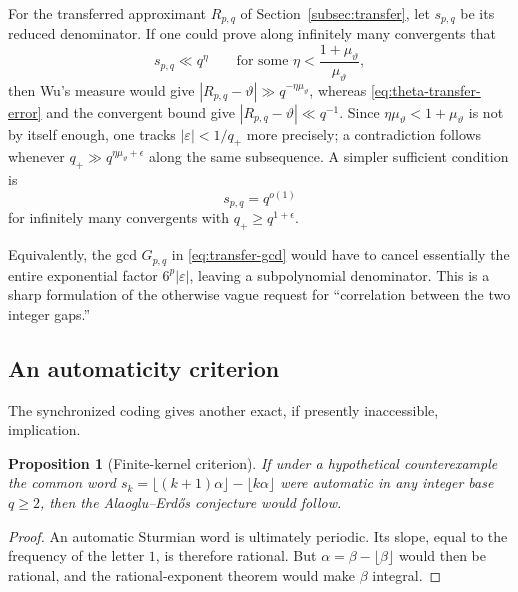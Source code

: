 \documentclass[11pt,oneside]{article}
\newtheorem{proposition}[theorem]{Proposition}
\theoremstyle{definition}
\theoremstyle{remark}
\begin{document}
For the transferred approximant $R_{p,q}$ of Section~\ref{subsec:transfer}, let $s_{p,q}$ be
its reduced denominator.  If one could prove along infinitely many convergents that
\begin{equation}\label{eq:poly-reduced-denominator}
 s_{p,q}\ll q^\eta
 \qquad\text{for some }\eta<\frac{1+\mu_\vartheta}{\mu_\vartheta},
\end{equation}
then Wu's measure would give
$|R_{p,q}-\vartheta|\gg q^{-\eta\mu_\vartheta}$, whereas
\eqref{eq:theta-transfer-error} and the convergent bound give
$|R_{p,q}-\vartheta|\ll q^{-1}$.  Since
$\eta\mu_\vartheta<1+\mu_\vartheta$ is not by itself enough, one tracks
$|\varepsilon|<1/q_{+}$ more precisely; a contradiction follows whenever
$q_{+}\gg q^{\eta\mu_\vartheta+\epsilon}$ along the same subsequence.  A simpler sufficient
condition is
\begin{equation}\label{eq:very-small-reduced-denominator}
 s_{p,q}=q^{o(1)}
\end{equation}
for infinitely many convergents with $q_{+}\ge q^{1+\epsilon}$.

Equivalently, the gcd $G_{p,q}$ in \eqref{eq:transfer-gcd} would have to cancel essentially the
entire exponential factor $6^p|\varepsilon|$, leaving a subpolynomial denominator.  This is a
sharp formulation of the otherwise vague request for ``correlation between the two integer
gaps.''

\subsection{An automaticity criterion}

The synchronized coding gives another exact, if presently inaccessible, implication.

\begin{proposition}[Finite-kernel criterion]\label{prop:automatic-criterion}
If under a hypothetical counterexample the common word
$s_k=\lfloor(k+1)\alpha\rfloor-\lfloor k\alpha\rfloor$ were automatic in any integer base
$q\ge2$, then the Alaoglu--Erd\H{o}s conjecture would follow.
\end{proposition}

\begin{proof}
An automatic Sturmian word is ultimately periodic.  Its slope, equal to the frequency of the
letter $1$, is therefore rational.  But $\alpha=\beta-\lfloor\beta\rfloor$ would then be
rational, and the rational-exponent theorem would make $\beta$ integral.
\end{proof}
\end{document}
